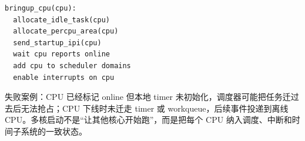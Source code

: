 \begin{lstlisting}
bringup_cpu(cpu):
  allocate_idle_task(cpu)
  allocate_percpu_area(cpu)
  send_startup_ipi(cpu)
  wait cpu reports online
  add cpu to scheduler domains
  enable interrupts on cpu
\end{lstlisting}

失败案例：CPU 已经标记 online 但本地 timer 未初始化，调度器可能把任务迁过去后无法抢占；CPU 下线时未迁走 timer 或 workqueue，后续事件投递到离线 CPU。多核启动不是“让其他核心开始跑”，而是把每个 CPU 纳入调度、中断和时间子系统的一致状态。
